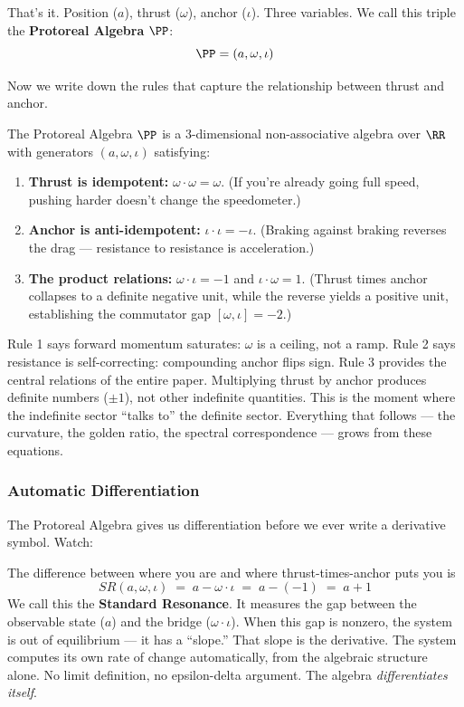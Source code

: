 That's it. Position ($a$), thrust ($\omega$), anchor ($\iota$). Three variables. We call this triple the \textbf{Protoreal Algebra} $\PP$:
$$\PP = (a, \omega, \iota)$$

Now we write down the rules that capture the relationship between thrust and anchor.

\begin{definition}\label{def:protoreal}
The Protoreal Algebra $\PP$ is a 3-dimensional non-associative algebra over $\RR$ with generators $(a, \omega, \iota)$ satisfying:
\begin{enumerate}
\item \textbf{Thrust is idempotent:} $\omega \cdot \omega = \omega$. (If you're already going full speed, pushing harder doesn't change the speedometer.)
\item \textbf{Anchor is anti-idempotent:} $\iota \cdot \iota = -\iota$. (Braking against braking reverses the drag --- resistance to resistance is acceleration.)
\item \textbf{The product relations:} $\omega \cdot \iota = -1$ and $\iota \cdot \omega = 1$. (Thrust times anchor collapses to a definite negative unit, while the reverse yields a positive unit, establishing the commutator gap $[\omega, \iota] = -2$.)
\end{enumerate}
\end{definition}

\begin{remark}
Rule 1 says forward momentum saturates: $\omega$ is a ceiling, not a ramp. Rule 2 says resistance is self-correcting: compounding anchor flips sign. Rule 3 provides the central relations of the entire paper. Multiplying thrust by anchor produces definite numbers ($\pm 1$), not other indefinite quantities. This is the moment where the indefinite sector ``talks to'' the definite sector. Everything that follows --- the curvature, the golden ratio, the spectral correspondence --- grows from these equations.
\end{remark}

\subsubsection*{Automatic Differentiation}

The Protoreal Algebra gives us differentiation before we ever write a derivative symbol. Watch:

The difference between where you are and where thrust-times-anchor puts you is
$$SR(a, \omega, \iota) \;=\; a - \omega \cdot \iota \;=\; a - (-1) \;=\; a + 1$$
We call this the \textbf{Standard Resonance}. It measures the gap between the observable state ($a$) and the bridge ($\omega \cdot \iota$). When this gap is nonzero, the system is out of equilibrium --- it has a ``slope.'' That slope is the derivative. The system computes its own rate of change automatically, from the algebraic structure alone. No limit definition, no epsilon-delta argument. The algebra \emph{differentiates itself}.

